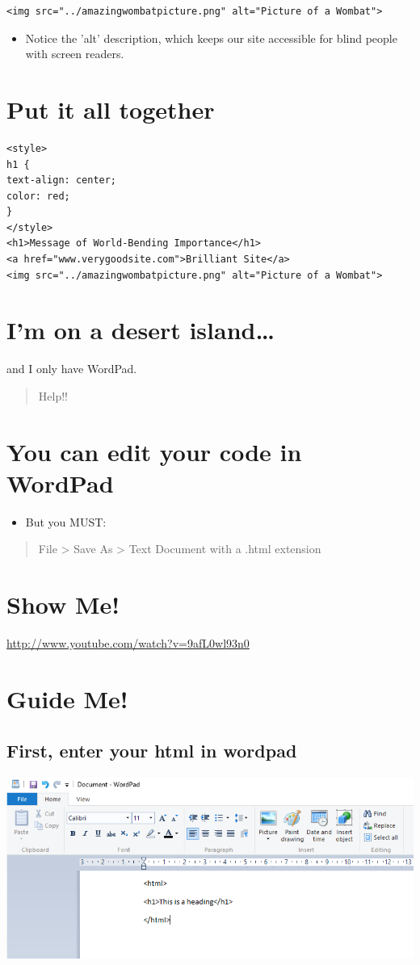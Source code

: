 \documentclass[11pt]{article}
\begin{document}
\begin{verbatim}
<img src="../amazingwombatpicture.png" alt="Picture of a Wombat">
\end{verbatim}
\begin{itemize}
\item Notice the 'alt' description, which keeps our site accessible for blind people with screen readers.
\end{itemize}
\section*{Put it all together}
\label{sec:orgheadline11}

\begin{verbatim}
<style> 
h1 { 
text-align: center;
color: red;
}
</style>
<h1>Message of World-Bending Importance</h1>
<a href="www.verygoodsite.com">Brilliant Site</a>
<img src="../amazingwombatpicture.png" alt="Picture of a Wombat">
\end{verbatim}
\section*{I'm on a desert island\ldots{}}
\label{sec:orgheadline12}
and I only have WordPad.

\begin{quote}
Help!!
\end{quote}

\section*{You can edit your code in WordPad}
\label{sec:orgheadline13}
\begin{itemize}
\item But you MUST:
\end{itemize}

\begin{quote}
File > Save As > Text Document
with a .html extension
\end{quote}
\section*{Show Me!}
\label{sec:orgheadline14}
\url{http://www.youtube.com/watch?v=9afL0wl93n0}
\section*{Guide Me!}
\label{sec:orgheadline18}
\subsection*{First, enter your html in wordpad}
\label{sec:orgheadline15}
\includegraphics[width=.9\linewidth]{../../img/wordpadhtmldoc.png}
\end{document}
